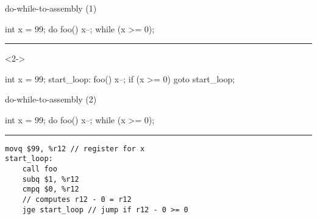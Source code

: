 \begin{frame}[fragile,label=loop1]{do-while-to-assembly (1)}
\begin{ccodeS}
int x = 99;
do {
    foo()
    x--;
} while (x >= 0);
\end{ccodeS}
\hrule
\begin{visibleenv}<2->
\begin{ccodeS}
    int x = 99;
start_loop:
    foo()
    x--;
    if (x >= 0) goto start_loop;
\end{ccodeS}
\end{visibleenv}
\end{frame}

\begin{frame}[fragile,label=loop2]{do-while-to-assembly (2)}
\begin{ccodeS}
int x = 99;
do {
    foo()
    x--;
} while (x >= 0);
\end{ccodeS}
\hrule
\begin{lstlisting}[language=myasm,style=small]
    movq $99, %r12 // register for x
start_loop:
    call foo
    subq $1, %r12
    cmpq $0, %r12
    // computes r12 - 0 = r12
    jge start_loop // jump if r12 - 0 >= 0
\end{lstlisting}
\end{frame}

